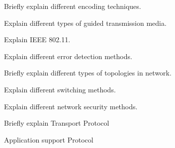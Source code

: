 \markB
\partC

\item \iitem Briefly explain different encoding techniques.
\Or
\item Explain different types of guided transmission media.
\ene

\newpage \again

\item \iitem Explain IEEE 802.11.
\Or
\item Explain different error detection methods.
\ene

\item \iitem Briefly explain different types of topologies in network.
\Or
\item Explain different switching methods.
\ene

\item \iitem  Explain different network security methods.
\Or
\item Briefly explain
\iitem Transport Protocol
\item Application support Protocol
\ene
\ene

\markC
\ene
